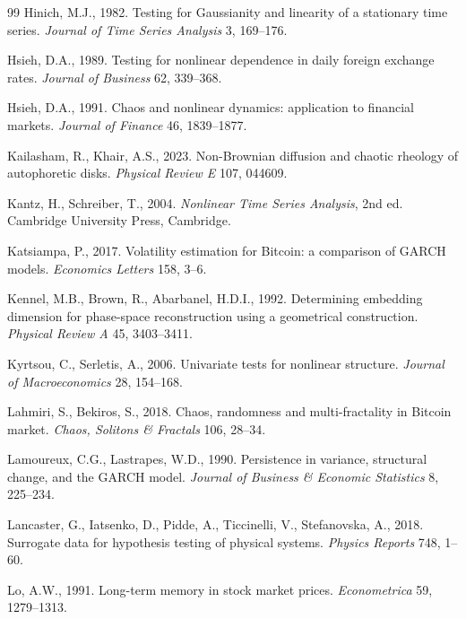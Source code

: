 \documentclass[11pt,a4paper]{article}
\begin{document}
\begin{thebibliography}{99}
Hinich, M.J., 1982. Testing for Gaussianity and linearity of a stationary time series. \emph{Journal of Time Series
Analysis} 3, 169--176.

Hsieh, D.A., 1989. Testing for nonlinear dependence in daily foreign exchange rates. \emph{Journal of Business} 62,
339--368.

Hsieh, D.A., 1991. Chaos and nonlinear dynamics: application to financial markets. \emph{Journal of Finance} 46,
1839--1877.

Kailasham, R., Khair, A.S., 2023. Non-Brownian diffusion and chaotic rheology of autophoretic disks. \emph{Physical
Review E} 107, 044609.

Kantz, H., Schreiber, T., 2004. \emph{Nonlinear Time Series Analysis}, 2nd ed. Cambridge University Press, Cambridge.

Katsiampa, P., 2017. Volatility estimation for Bitcoin: a comparison of GARCH models. \emph{Economics Letters} 158,
3--6.

Kennel, M.B., Brown, R., Abarbanel, H.D.I., 1992. Determining embedding dimension for phase-space reconstruction using a
geometrical construction. \emph{Physical Review A} 45, 3403--3411.

Kyrtsou, C., Serletis, A., 2006. Univariate tests for nonlinear structure. \emph{Journal of Macroeconomics} 28,
154--168.

Lahmiri, S., Bekiros, S., 2018. Chaos, randomness and multi-fractality in Bitcoin market. \emph{Chaos, Solitons \&
Fractals} 106, 28--34.

Lamoureux, C.G., Lastrapes, W.D., 1990. Persistence in variance, structural change, and the GARCH model. \emph{Journal
of Business \& Economic Statistics} 8, 225--234.

Lancaster, G., Iatsenko, D., Pidde, A., Ticcinelli, V., Stefanovska, A., 2018. Surrogate data for hypothesis testing of
physical systems. \emph{Physics Reports} 748, 1--60.

Lo, A.W., 1991. Long-term memory in stock market prices. \emph{Econometrica} 59, 1279--1313.


\end{thebibliography}
\end{document}
